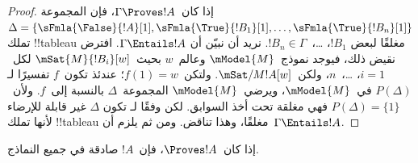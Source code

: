 \documentclass[../../../include/open-logic-section]{subfiles}
\begin{document}
\begin{proof}
  إذا كان~$\Gamma \Proves !A$، فإن المجموعة
  $\Delta = \{\sFmla{\False}{!A}[1], \sFmla{\True}{!B_1}[1],
  \dots, \sFmla{\True}{!B_n}[1]\}$ تملك !!{tableau} مغلقًا لبعض
  $!B_1$، \dots،~$!B_n \in \Gamma$. نريد أن نبيّن أن
  $\Gamma \Entails !A$. افترض نقيض ذلك، فيوجد نموذج~$\mModel{M}$
  وعالم~$w$ بحيث~$\mSat{M}{!B_i}[w]$ لكل~$i=1$، \dots،~$n$،
  ولكن~$\mSat/{M}{!A}[w]$. ولتكن~$f(1) = w$؛ عندئذ تكون~$f$ تفسيرًا
  لـ$P(\Delta)$ في~$\mModel{M}$، ويرضي~$\mModel{M}$ المجموعة~$\Delta$
  بالنسبة إلى~$f$. ولأن~$P(\Delta)=\{1\}$ فهي مغلقة تحت أخذ السوابق.
  لكن وفقًا لـ تكون
  $\Delta$ غير قابلة للإرضاء لأنها تملك !!{tableau} مغلقًا، وهذا تناقض.
  ومن ثم يلزم أن~$\Gamma \Entails !A$.
\end{proof}

\begin{cor}
إذا كان~$\Proves !A$، فإن~$!A$ صادقة في جميع النماذج.
\end{cor}
\end{document}
